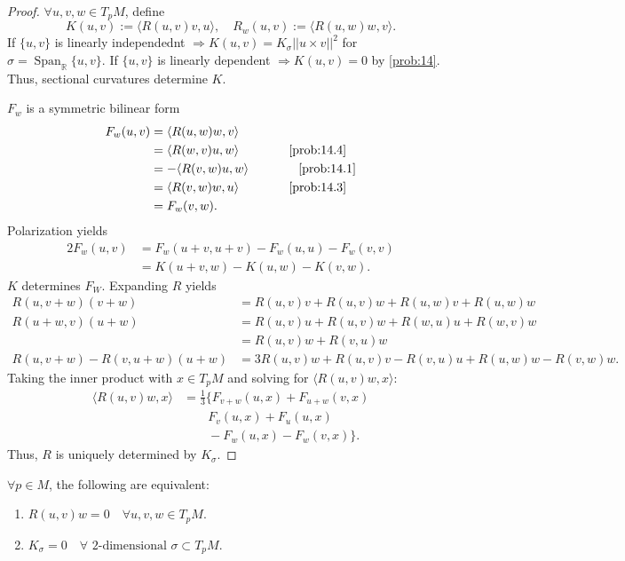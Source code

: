 \begin{proof}
$\forall u,v,w\in T_pM$, define 
\[
K(u,v) := \langle R(u,v)v,u\rangle, \quad R_w(u,v) := \langle R(u,w)w, v\rangle.
\]
If $\{u,v\}$ is linearly independednt $\Rightarrow K(u,v) = K_{\sigma} ||u\times v||^2$ for $\sigma = \operatorname{Span}_{\mathbb{R}}\{u,v\}$.
If $\{u,v\}$ is linearly dependent $\Rightarrow K(u,v) = 0$ by \autoref{prob:14}. 
Thus, sectional curvatures determine $K$.

$F_w$ is a symmetric bilinear form
\[
\begin{aligned}
F_w(u,v) &= \langle R(u,w)w, v\rangle\\
&= \langle R(w,v)u, w\rangle  \qquad\qquad {\text{\autoref{prob:14.4}}}\\
&= -\langle R(v, w)u, w\rangle \qquad\qquad {\text{\autoref{prob:14.1}}}\\ 
&= \langle R(v, w)w, u\rangle \qquad\qquad {\text{\autoref{prob:14.3}}}\\
&= F_w(v,w).
\end{aligned}
\]
Polarization yields
\[
\begin{aligned}
2F_w(u,v) &= F_w(u+v, u+v) - F_w(u, u) - F_w(v,v) \\
&= K(u+v, w) - K(u, w) - K(v, w).
\end{aligned}
\]
$K$ determines $F_W$. Expanding $R$ yields
\[
\begin{aligned}
R(u, v+w)(v + w) &= R(u, v)v + R(u, v)w + R(u, w)v + R(u, w)w \\
R(u+w, v)(u+w) &= R(u,v)u + R(u, v)w + R(w, u)u + R(w, v)w \\
&= R(u,v)w + R(v,u)w \\
R(u, v+w) - R(v,u+w)(u + w) &= 3R(u, v)w + R(u,v)v - R(v, u)u + R(u,w)w -R(v,w)w.
\end{aligned}
\]
Taking the inner product with $x \in T_pM$ and solving for $\langle R(u,v)w,x\rangle$:
\[
\begin{aligned}
\langle R(u,v)w, x\rangle &= \frac13\{F_{v+w}(u,x) + F_{u + w}(v,x) \\
& \qquad F_v(u,x) + F_u(u,x) \\
& \qquad - F_w(u,x) - F_w(v,x) \}.
\end{aligned}
\]
Thus, $R$ is uniquely determined by $K_{\sigma}$.
\end{proof}

\begin{corollary}\label{corollary:9.4}
$\forall p \in M$, the following are equivalent:
\begin{enumerate}[label=(\arabic*)]
\item $R(u,v)w = 0 \quad \forall u,v,w \in T_pM$.
\item $K_{\sigma} = 0 \quad \forall \text{ 2-dimensional } \sigma \subset T_pM$.
\end{enumerate}
\end{corollary}

